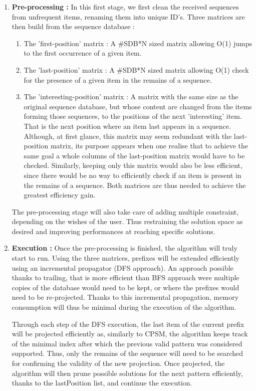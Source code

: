 \documentclass{eplmastersthesis}
\begin{document}
\begin{enumerate}
\item \textbf{Pre-processing :} In this first stage, we first clean the received sequences from unfrequent items, renaming them into unique ID's. Three matrices are then build from the sequence database :
	\begin{enumerate}
		\item The 'first-position' matrix : A \#SDB*N sized matrix allowing O(1) jumps to the first occurrence of a given item. 
		\item The 'last-position' matrix : A  \#SDB*N sized matrix allowing O(1) check for the presence of a given item in the remains of a sequence.
		\item The 'interesting-position' matrix : A matrix with the same size as the original sequence database, but whose content are changed from the items forming those sequences, to the positions of the next 'interesting' item. That is the next position where an item last appears in a sequence. \\ Although, at first glance, this matrix may seem redundant with the last-position matrix, its purpose appears when one realise that to achieve the same goal a whole columns of the last-position matrix would have to be checked. Similarly, keeping only this matrix would also be less efficient, since there would be no way to efficiently check if an item is present in the remains of a sequence. Both matrices are thus needed to achieve the greatest efficiency gain. 
	\end{enumerate}
	
	The pre-processing stage will also take care of adding multiple constraint, depending on the wishes of the user. Thus restraining the solution space as desired and improving performances at reaching specific solutions.
	
\item \textbf{Execution :} Once the pre-processing is finished, the algorithm will truly start to run. Using the three matrices, prefixes will be extended efficiently using an incremental propagator (DFS approach). An approach possible thanks to trailing, that is more efficient than BFS approach were multiple copies of the database would need to be kept, or where the prefixes would need to be re-projected. Thanks to this incremental propagation, memory consumption will thus be minimal during the execution of the algorithm. \newline

Through each step of the DFS execution, the last item of the current prefix will be projected efficiently as, similarly to CPSM, the algorithm keeps track of the minimal index after which the previous valid pattern was considered supported. Thus, only the remains of the sequence will need to be searched for confirming the validity of the new projection. Once projected, the algorithm will then prune possible solutions for the next pattern efficiently, thanks to the lastPosition list, and continue the execution. 


\end{enumerate}
\end{document}

